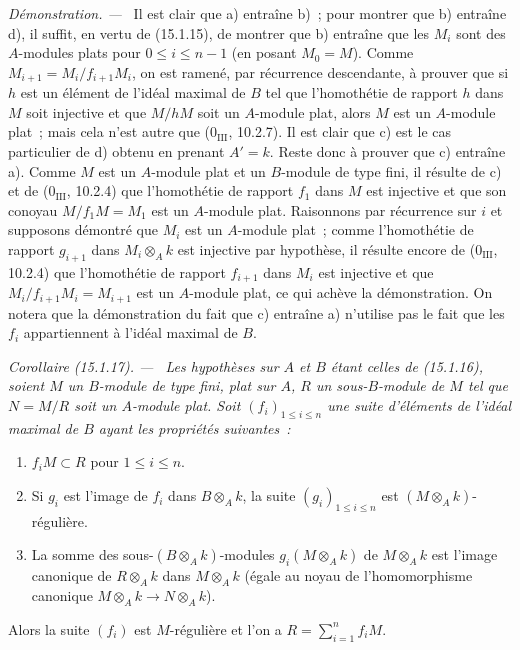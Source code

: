 \documentclass[10pt,oneside]{book}
\makeatletter
\newcommand{\setmanualcurrentlabel}[1]{\def\@currentlabel{#1}}
\newenvironment{corollary}[1][]{%
  \setmanualcurrentlabel{#1}\par\medskip\noindent\itshape Corollaire (#1). ---\ }{\par}
\newenvironment{proof}{%
  \par\medskip\noindent\textit{Démonstration. ---\ }}{\par}
\makeatother
\begin{document}
\begin{proof}
Il est clair que a) entraîne b)~; pour montrer que b) entraîne d), il suffit,
en vertu de (15.1.15), de montrer que b) entraîne que les $M_i$ sont des
$A$-modules plats pour $0\leq i\leq n-1$ (en posant $M_0=M$). Comme
$M_{i+1}=M_i/f_{i+1}M_i$, on est ramené, par récurrence descendante, à prouver
que si $h$ est un élément de l'idéal maximal de $B$ tel que l'homothétie de
rapport $h$ dans $M$ soit injective et que $M/hM$ soit un $A$-module plat,
alors $M$ est un $A$-module plat~; mais cela n'est autre que
($0_{\mathrm{III}}$, 10.2.7). Il est clair que c) est le cas particulier de
d) obtenu en prenant $A'=k$. Reste donc à prouver que c) entraîne a). Comme
$M$ est un $A$-module plat et un $B$-module de type fini, il résulte de c) et
de ($0_{\mathrm{III}}$, 10.2.4) que l'homothétie de rapport $f_1$ dans $M$
est injective et que son conoyau $M/f_1M=M_1$ est un $A$-module plat.
Raisonnons par récurrence sur $i$ et supposons démontré que $M_i$ est un
$A$-module plat~; comme l'homothétie de rapport $g_{i+1}$ dans
$M_i\otimes_A k$ est injective par hypothèse, il résulte encore de
($0_{\mathrm{III}}$, 10.2.4) que l'homothétie de rapport $f_{i+1}$ dans
$M_i$ est injective et que $M_i/f_{i+1}M_i=M_{i+1}$ est un $A$-module plat,
ce qui achève la démonstration. On notera que la démonstration du fait que c)
entraîne a) n'utilise pas le fait que les $f_i$ appartiennent à l'idéal
maximal de $B$.
\end{proof}

\begin{corollary}[15.1.17]
\label{0.15.1.17-fr}
Les hypothèses sur $A$ et $B$ étant celles de (15.1.16), soient $M$ un
$B$-module de type fini, plat sur $A$, $R$ un sous-$B$-module de $M$ tel que
$N=M/R$ soit un $A$-module plat. Soit $(f_i)_{1\leq i\leq n}$ une suite
d'éléments de l'idéal maximal de $B$ ayant les propriétés suivantes~:
\begin{enumerate}
  \item[(i)] $f_iM\subset R$ pour $1\leq i\leq n$.
  \item[(ii)] Si $g_i$ est l'image de $f_i$ dans $B\otimes_A k$, la suite
  $(g_i)_{1\leq i\leq n}$ est $(M\otimes_A k)$-régulière.
  \item[(iii)] La somme des sous-$(B\otimes_A k)$-modules
  $g_i(M\otimes_A k)$ de $M\otimes_A k$ est l'image canonique de
  $R\otimes_A k$ dans $M\otimes_A k$ (égale au noyau de l'homomorphisme
  canonique $M\otimes_A k\to N\otimes_A k$).
\end{enumerate}
Alors la suite $(f_i)$ est $M$-régulière et l'on a
$R=\sum_{i=1}^n f_iM$.
\end{corollary}
\end{document}
